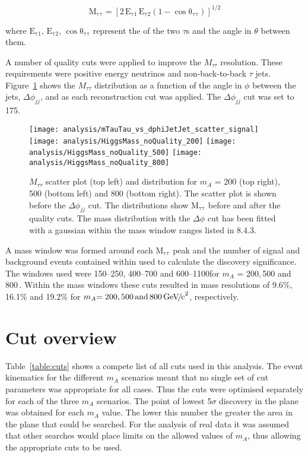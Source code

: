 \begin{equation}
	\mathrm{ M_{\tau \tau} = [2\,E_{\tau 1}\,E_{\tau 2} ( 1 - \cos{\theta_{\tau \tau}})]^{1/2} }
\end{equation}

where $\mathrm{E_{\tau 1},\,E_{\tau 2},\,\cos{\theta_{\tau \tau}}}$ represent the \ET of the two $\tau$s and the angle in $\theta$ between them. 

A number of quality cuts were applied to improve the $M_{\tau\tau}$ resolution. These requirements were positive energy neutrinos and non-back-to-back $\tau$ jets. Figure~\ref{fig:mass_resolution} shows the $M_{\tau\tau}$ distribution as a function of the angle in $\phi$ between the jets, $\Delta \phi_{jj}$, and as each reconstruction cut was applied. The $\Delta \phi_{jj}$ cut was set to 175\de.

\begin{figure}[!Hhtb]
\centering
\texttt{[image: analysis/mTauTau\_vs\_dphiJetJet\_scatter\_signal]}
\texttt{[image: analysis/HiggsMass\_noQuality\_200]}
\texttt{[image: analysis/HiggsMass\_noQuality\_500]}
\texttt{[image: analysis/HiggsMass\_noQuality\_800]}
\caption{$M_{\tau \tau}$ scatter plot (top left) and distribution for $m_{A}$ = 200 (top right), 500 (bottom left) and 800 (bottom right)\GeVcc . The scatter plot is shown before the $\Delta \phi_{jj}$ cut. The distributions show $\mathrm{M_{\tau \tau}}$ before and after the quality cuts. The mass distribution with the $\Delta \phi$ cut has been fitted with a gaussian within the mass window ranges listed in 8.4.3.\label{fig:mass_resolution}}
\end{figure}

A mass window was formed around each $\mathrm{M_{\tau \tau}}$ peak and the number of signal and background events contained within used to calculate the discovery significance. The windows used were 150--250, 400--700 and 600--1100\GeVcc for $m_{A}$ = 200,\,500 and 800\,\GeVcc. Within the mass windows these cuts resulted in mass resolutions of 9.6\%, 16.1\% and 19.2\% for $m_{A}\mathrm{=200, 500\, and\, 800 {\,\mathrm{Ge\hspace{-.08em}V\hspace{-0.16em}/\hspace{-0.08em}c}^\mathrm{2}}}$, respectively. 

\section{Cut overview}
Table~\ref{table:cuts} shows a compete list of all cuts used in this analysis. The event kinematics for the different $m_{A}$ scenarios meant that no single set of cut parameters was appropriate for all cases. Thus the cuts were optimised separately for each of the three $m_{A}$ scenarios. The point of lowest 5$\sigma$ discovery in the \plane plane was obtained for each $m_A$ value. The lower this number the greater the area in the \plane plane that could be searched. For the analysis of real data it was assumed that other searches would place limits on the allowed values of $m_{A}$, thus allowing the appropriate cuts to be used. 


